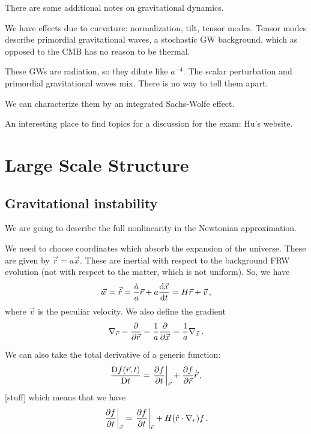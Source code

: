 \documentclass[main.tex]{subfiles}
\begin{document}

There are some additional notes on gravitational dynamics.

We have effects due to curvature: normalization, tilt, tensor modes. 
Tensor modes describe primordial gravitational waves, a stochastic GW background, which as opposed to the CMB has no reason to be thermal. 

These GWs are radiation, so they dilute like \(a^{-4}\). 
The scalar perturbation and primordial gravitational waves mix. There is no way to tell them apart.

We can characterize them by an integrated Sachs-Wolfe effect. 

An interesting place to find topics for a discussion for the exam: Hu's website.

\chapter{Large Scale Structure}

\section{Gravitational instability}

We are going to describe the full nonlinearity in the Newtonian approximation. 

We need to choose coordinates which absorb the expansion of the universe. These are given by \(\vec{r} = a \vec{x}\). 
These are inertial with respect to the background FRW evolution (not with respect to the matter, which is not uniform).
So, we have 
%
\begin{align}
\vec{w} = \vec{\dot{r}} = \frac{\dot{a}}{a} \vec{r}
+ a \dv{\vec{x}}{t} = H \vec{r} + \vec{v}
\,,
\end{align}
%
where \(\vec{v}\) is the peculiar velocity. We also define the gradient 
%
\begin{align}
\nabla_{\vec{r}} = \pdv{}{\vec{r}} = \frac{1}{a} \pdv{}{\vec{x}} = \frac{1}{a} \nabla_{\vec{x}} 
\,.
\end{align}

We can also take the total derivative of a generic function: 
%
\begin{align}
\frac{\DD f(\vec{r}, t)}{\DD t}
= \eval{\pdv{f}{t}}_{\vec{r}} + \pdv{f}{\vec{r}} \dot{\vec{r}} 
\,,
\end{align}
%
[stuff]
which means that we have 
%
\begin{align}
\eval{\pdv{f}{t}}_{\vec{x}} = \eval{\pdv{f}{t}}_{\vec{r}}
+ H \qty(\hat{r} \cdot \nabla_{r}) f
\,.
\end{align}
\end{document}
